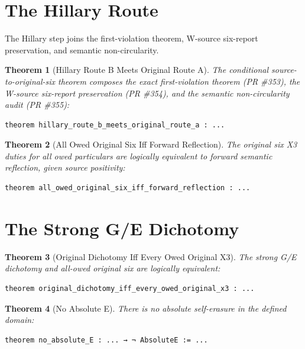 \documentclass[11pt,a4paper]{article}
\newtheorem{theorem}{Theorem}[section]
\theoremstyle{definition}
\theoremstyle{remark}
\begin{document}
\section{The Hillary Route}

The Hillary step joins the first-violation theorem, W-source six-report preservation, and semantic non-circularity.

\begin{theorem}[Hillary Route B Meets Original Route A]
The conditional source-to-original-six theorem composes the exact first-violation theorem (PR \#353), the W-source six-report preservation (PR \#354), and the semantic non-circularity audit (PR \#355):
\begin{lstlisting}
theorem hillary_route_b_meets_original_route_a : ...
\end{lstlisting}
\end{theorem}

\begin{theorem}[All Owed Original Six Iff Forward Reflection]
The original six X3 duties for all owed particulars are logically equivalent to forward semantic reflection, given source positivity:
\begin{lstlisting}
theorem all_owed_original_six_iff_forward_reflection : ...
\end{lstlisting}
\end{theorem}

\section{The Strong G/E Dichotomy}

\begin{theorem}[Original Dichotomy Iff Every Owed Original X3]
The strong G/E dichotomy and all-owed original six are logically equivalent:
\begin{lstlisting}
theorem original_dichotomy_iff_every_owed_original_x3 : ...
\end{lstlisting}
\end{theorem}

\begin{theorem}[No Absolute E]
There is no absolute self-erasure in the defined domain:
\begin{lstlisting}
theorem no_absolute_E : ... → ¬ AbsoluteE := ...
\end{lstlisting}
\end{theorem}

\end{document}
